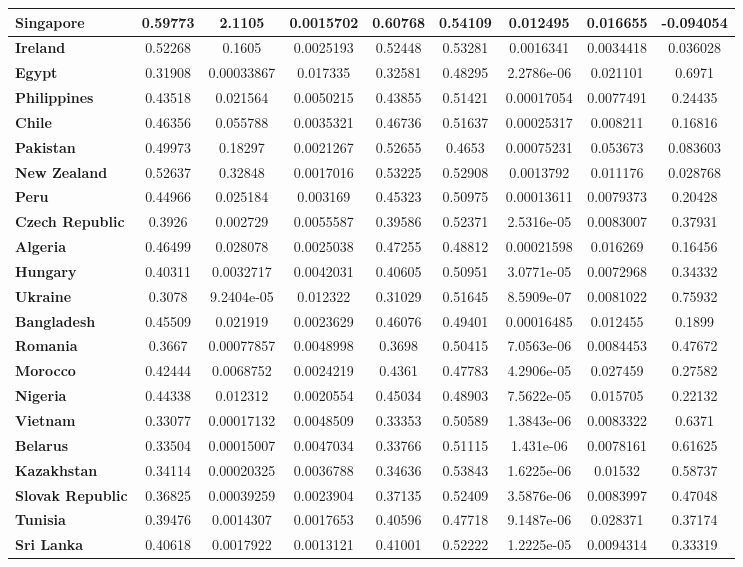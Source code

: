 \begin{tiny}
\begin{tabular}{|l|c|c|c|c|c|c|c|c|}
\textbf{Singapore}&0.59773&2.1105&0.0015702&0.60768&0.54109&0.012495&0.016655&-0.094054\\\hline
\textbf{Ireland}&0.52268&0.1605&0.0025193&0.52448&0.53281&0.0016341&0.0034418&0.036028\\\hline
\textbf{Egypt}&0.31908&0.00033867&0.017335&0.32581&0.48295&2.2786e-06&0.021101&0.6971\\\hline
\textbf{Philippines}&0.43518&0.021564&0.0050215&0.43855&0.51421&0.00017054&0.0077491&0.24435\\\hline
\textbf{Chile}&0.46356&0.055788&0.0035321&0.46736&0.51637&0.00025317&0.008211&0.16816\\\hline
\textbf{Pakistan}&0.49973&0.18297&0.0021267&0.52655&0.4653&0.00075231&0.053673&0.083603\\\hline
\textbf{New Zealand}&0.52637&0.32848&0.0017016&0.53225&0.52908&0.0013792&0.011176&0.028768\\\hline
\textbf{Peru}&0.44966&0.025184&0.003169&0.45323&0.50975&0.00013611&0.0079373&0.20428\\\hline
\textbf{Czech Republic}&0.3926&0.002729&0.0055587&0.39586&0.52371&2.5316e-05&0.0083007&0.37931\\\hline
\textbf{Algeria}&0.46499&0.028078&0.0025038&0.47255&0.48812&0.00021598&0.016269&0.16456\\\hline
\textbf{Hungary}&0.40311&0.0032717&0.0042031&0.40605&0.50951&3.0771e-05&0.0072968&0.34332\\\hline
\textbf{Ukraine}&0.3078&9.2404e-05&0.012322&0.31029&0.51645&8.5909e-07&0.0081022&0.75932\\\hline
\textbf{Bangladesh}&0.45509&0.021919&0.0023629&0.46076&0.49401&0.00016485&0.012455&0.1899\\\hline
\textbf{Romania}&0.3667&0.00077857&0.0048998&0.3698&0.50415&7.0563e-06&0.0084453&0.47672\\\hline
\textbf{Morocco}&0.42444&0.0068752&0.0024219&0.4361&0.47783&4.2906e-05&0.027459&0.27582\\\hline
\textbf{Nigeria}&0.44338&0.012312&0.0020554&0.45034&0.48903&7.5622e-05&0.015705&0.22132\\\hline
\textbf{Vietnam}&0.33077&0.00017132&0.0048509&0.33353&0.50589&1.3843e-06&0.0083322&0.6371\\\hline
\textbf{Belarus}&0.33504&0.00015007&0.0047034&0.33766&0.51115&1.431e-06&0.0078161&0.61625\\\hline
\textbf{Kazakhstan}&0.34114&0.00020325&0.0036788&0.34636&0.53843&1.6225e-06&0.01532&0.58737\\\hline
\textbf{Slovak Republic}&0.36825&0.00039259&0.0023904&0.37135&0.52409&3.5876e-06&0.0083997&0.47048\\\hline
\textbf{Tunisia}&0.39476&0.0014307&0.0017653&0.40596&0.47718&9.1487e-06&0.028371&0.37174\\\hline
\textbf{Sri Lanka}&0.40618&0.0017922&0.0013121&0.41001&0.52222&1.2225e-05&0.0094314&0.33319\\\hline
\end{tabular}
\end{tiny}